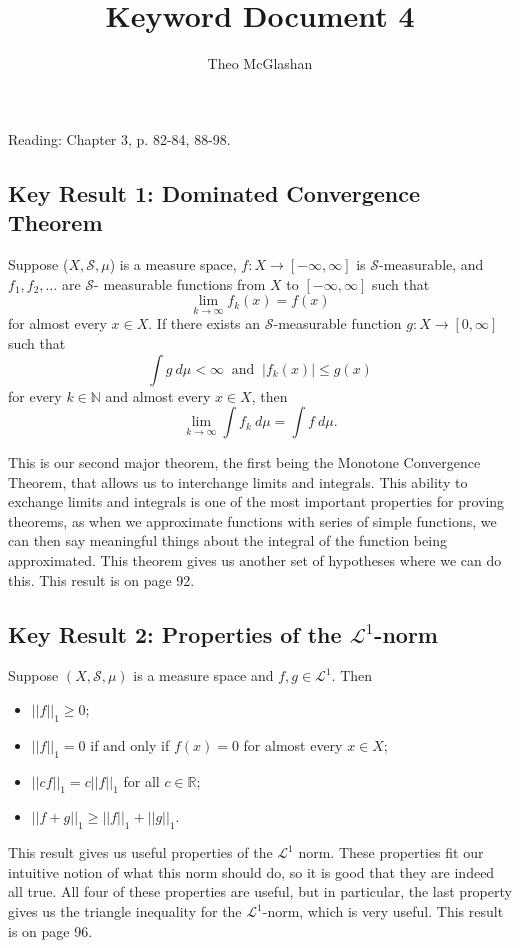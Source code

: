 \documentclass[12pt]{article}
\title{Keyword Document 4}
\author{Theo McGlashan}
\date{}
\def\R{\mathbb{R}}
\def\N{\mathbb{N}}
\begin{document}
\maketitle

Reading: Chapter 3, p. 82-84, 88-98.

\subsection*{Key Result 1: Dominated Convergence Theorem}

Suppose ($X, \mathcal{S}, \mu$) is a measure space, $f : X \to [-\infty, \infty]$ is $\mathcal{S}$-measurable, and $f_1, f_2, \ldots$ are $\mathcal{S}$- measurable functions from $X$ to $[-\infty, \infty]$ such that $$\lim_{k \to \infty} f_k(x) = f(x)$$ for almost every $x \in X$. If there exists an $\mathcal{S}$-measurable function $g : X \to [0, \infty]$ such that $$\int g ~ d \mu < \infty ~\text{ and }~ |f_k(x)| \leq g(x)$$ for every $k \in \N$ and almost every $x \in X$, then $$\lim_{k\to\infty} \int f_k ~d \mu = \int f ~d\mu.$$

This is our second major theorem, the first being the Monotone Convergence Theorem, that allows us to interchange limits and integrals. This ability to exchange limits and integrals is one of the most important properties for proving theorems, as when we approximate functions with series of simple functions, we can then say meaningful things about the integral of the function being approximated. This theorem gives us another set of hypotheses where we can do this. This result is on page 92.

\subsection*{Key Result 2: Properties of the $\mathcal{L}^1$-norm}

Suppose $(X, \mathcal{S}, \mu)$ is a measure space and $f, g \in \mathcal{L}^1$. Then
\begin{itemize}
    \item $||f||_1 \geq 0$;
    \item $||f||_1 = 0$ if and only if $f(x) = 0$ for almost every $x \in X$;
    \item $||cf||_1 = c||f||_1$ for all $c \in \R$;
    \item $||f + g||_1 \geq ||f||_1 + ||g||_1.$
\end{itemize}

This result gives us useful properties of the $\mathcal{L}^1$ norm. These properties fit our intuitive notion of what this norm should do, so it is good that they are indeed all true. All four of these properties are useful, but in particular, the last property gives us the triangle inequality for the $\mathcal{L}^1$-norm, which is very useful. This result is on page 96.
\end{document}
